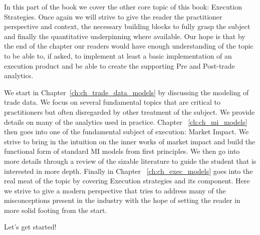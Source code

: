 
In this part of the book we cover the other core topic of this book: Execution Strategies. Once again we will strive to give the reader the practitioner perspective and context, the necessary building blocks to fully grasp the subject and finally the quantitative underpinning where available.  Our hope is that by the end of the chapter our readers would have enough understanding of the topic to be able to, if asked, to implement at least a basic implementation of an execution product and be able to create the supporting Pre and Post-trade analytics.

We start in Chapter~\ref{ch:ch_trade_data_models} by discussing the modeling of trade data. We focus on several fundamental topics that are critical to practitioners but often disregarded by other treatment of the subject. We provide details on many of the analytics used in practice. Chapter ~\ref{ch:ch_mi_models} then goes into one of the fundamental subject of execution: Market Impact. We strive to bring in the intuition on the inner works of market impact and build the functional form of standard MI models from first principles. We then go into more details through a review of the sizable literature to guide the student that is interested in more depth. Finally in Chapter ~\ref{ch:ch_exec_models} goes into the real meat of the topic by covering Execution strategies and its component. Here we strive to give a modern perspective that tries to address many of the misconceptions present in the industry with the hope of setting the reader in more solid footing from the start.

Let's get started!
